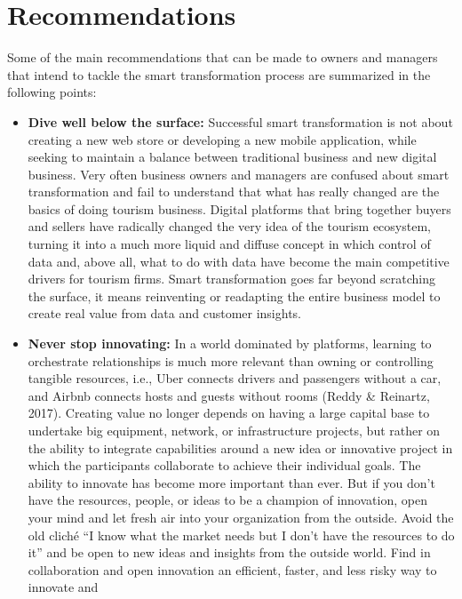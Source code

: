 \documentclass[
  letterpaper,
  DIV=11,
  numbers=noendperiod]{scrreprt}
\begin{document}
\hypertarget{recommendations}{%
\section{Recommendations}\label{recommendations}}

Some of the main recommendations that can be made to owners and managers
that intend to tackle the smart transformation process are summarized in
the following points:

\begin{itemize}
\item
  \textbf{Dive well below the surface:} Successful smart transformation
  is not about creating a new web store or developing a new mobile
  application, while seeking to maintain a balance between traditional
  business and new digital business. Very often business owners and
  managers are confused about smart transformation and fail to
  understand that what has really changed are the basics of doing
  tourism business. Digital platforms that bring together buyers and
  sellers have radically changed the very idea of the tourism ecosystem,
  turning it into a much more liquid and diffuse concept in which
  control of data and, above all, what to do with data have become the
  main competitive drivers for tourism firms. Smart transformation goes
  far beyond scratching the surface, it means reinventing or readapting
  the entire business model to create real value from data and customer
  insights.
\item
  \textbf{Never stop innovating:} In a world dominated by platforms,
  learning to orchestrate relationships is much more relevant than
  owning or controlling tangible resources, i.e., Uber connects drivers
  and passengers without a car, and Airbnb connects hosts and guests
  without rooms (Reddy \& Reinartz, 2017). Creating value no longer
  depends on having a large capital base to undertake big equipment,
  network, or infrastructure projects, but rather on the ability to
  integrate capabilities around a new idea or innovative project in
  which the participants collaborate to achieve their individual goals.
  The ability to innovate has become more important than ever. But if
  you don't have the resources, people, or ideas to be a champion of
  innovation, open your mind and let fresh air into your organization
  from the outside. Avoid the old cliché ``I know what the market needs
  but I don't have the resources to do it'' and be open to new ideas and
  insights from the outside world. Find in collaboration and open
  innovation an efficient, faster, and less risky way to innovate and

\end{itemize}
\end{document}
